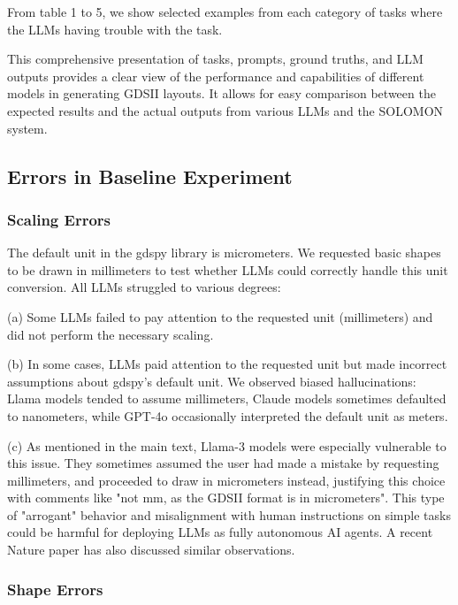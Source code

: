 \documentclass{article}
\begin{document}
From table 1 to 5, we show selected examples from each category of tasks where the LLMs having trouble with the task.



This comprehensive presentation of tasks, prompts, ground truths, and LLM outputs provides a clear view of the performance and capabilities of different models in generating GDSII layouts. It allows for easy comparison between the expected results and the actual outputs from various LLMs and the SOLOMON system.

\subsection{Errors in Baseline Experiment}
\label{appendix:baseline_errors}

\subsubsection{Scaling Errors}
\label{appendix:scaling_errors}

The default unit in the gdspy library is micrometers. We requested basic shapes to be drawn in millimeters to test whether LLMs could correctly handle this unit conversion. All LLMs struggled to various degrees:

(a) Some LLMs failed to pay attention to the requested unit (millimeters) and did not perform the necessary scaling.

(b) In some cases, LLMs paid attention to the requested unit but made incorrect assumptions about gdspy's default unit. We observed biased hallucinations: Llama models tended to assume millimeters, Claude models sometimes defaulted to nanometers, while GPT-4o occasionally interpreted the default unit as meters.

(c) As mentioned in the main text, Llama-3 models were especially vulnerable to this issue. They sometimes assumed the user had made a mistake by requesting millimeters, and proceeded to draw in micrometers instead, justifying this choice with comments like "not mm, as the GDSII format is in micrometers". This type of "arrogant" behavior and misalignment with human instructions on simple tasks could be harmful for deploying LLMs as fully autonomous AI agents. A recent Nature paper \cite{ZhouNature2024} has also discussed similar observations.

\subsubsection{Shape Errors}
\label{appendix:shape_errors}
\end{document}
